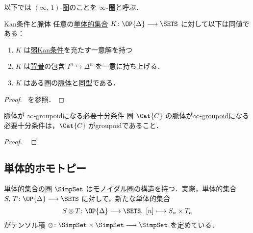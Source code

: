 \documentclass[TQFT_main]{subfiles}
\begin{document}
\begin{marker}
    以下では $(\infty,\, 1)$-圏のことを $\bm{\infty}$\textbf{-圏}と呼ぶ．
\end{marker}

\begin{mytheo}[label=thm:KanCplx]{Kan条件と脈体}
    任意の\hyperref[def:SimpSet]{単体的集合} $K \colon \OP{\Delta} \lto \SETS$ に対して以下は同値である：
    \begin{enumerate}
        \item $K$ は\hyperref[def:KanCplx]{弱Kan条件}を充たす一意解を持つ
        \item $K$ は\hyperref[def:horn]{背骨}の包含 $I^n \hookrightarrow \Delta^n$ を一意に持ち上げる．
        \item $K$ はある圏の\hyperref[def:nerve]{脈体}と\hyperref[def:iso]{同型}である．
    \end{enumerate}
\end{mytheo}

\begin{proof}
    ~\cite[p.20, Theorem 1.1.52]{Land2021infinity}を参照．
\end{proof}

\begin{myprop}[label=prop:nerve]{脈体が $\infty$-groupoidになる必要十分条件}
    圏 $\Cat{C}$ の\hyperref[def:nerve]{脈体}が\hyperref[def:infinity-1]{$\infty$-groupoid}になる必要十分条件は，$\Cat{C}$ がgroupoidであること．
\end{myprop}

\begin{proof}
    ~\cite[p.23, Lemma 1.1.54]{Land2021infinity}
\end{proof}

\subsection{単体的ホモトピー}

\hyperref[def:SimpSet]{単体的集合の圏} $\SimpSet$ は\hyperref[def:monoidal-category]{モノイダル圏}の構造を持つ．実際，単体的集合 $S,\, T \colon \OP{\Delta} \lto \SETS$ に対して，新たな単体的集合
\begin{align}
    S \otimes T \colon \OP{\Delta} \lto \SETS,\; [n] \lmto S_n \times T_n
\end{align}
がテンソル積 $\otimes \colon \SimpSet \times \SimpSet \lto \SimpSet$ を定めている．

\end{document}
